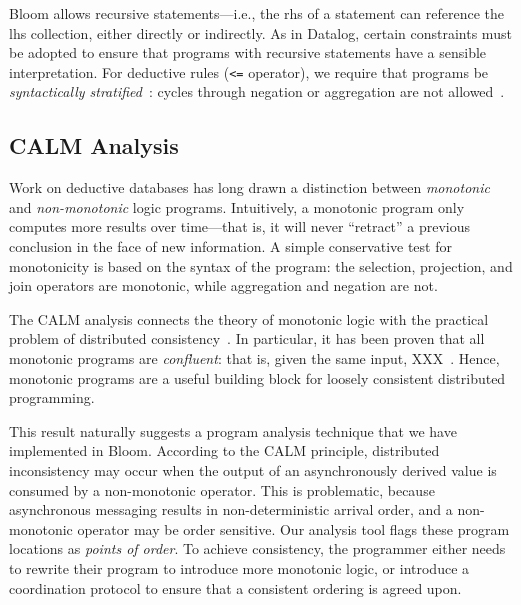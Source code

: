 Bloom allows recursive statements---i.e., the rhs of a statement can reference
the lhs collection, either directly or indirectly. As in Datalog, certain
constraints must be adopted to ensure that programs with recursive statements
have a sensible interpretation. For deductive rules (\verb+<=+ operator), we
require that programs be \emph{syntactically stratified}~\cite{Apt1988}: cycles
through negation or aggregation are not allowed~\cite{dedalus}.

\subsection{CALM Analysis}
\label{sec:bg-calm}

Work on deductive databases has long drawn a distinction between
\emph{monotonic} and \emph{non-monotonic} logic programs. Intuitively, a
monotonic program only computes more results over time---that is, it will never
``retract'' a previous conclusion in the face of new information. A simple
conservative test for monotonicity is based on the syntax of the program: the
selection, projection, and join operators are monotonic, while aggregation and
negation are not.

The CALM analysis connects the theory of monotonic logic with the practical
problem of distributed consistency~\cite{Alvaro2011}. In particular, it has been
proven that all monotonic programs are \emph{confluent}: that is, given the same
input, XXX~\cite{Ameloot2011}. Hence, monotonic programs are a useful building
block for loosely consistent distributed programming.

This result naturally suggests a program analysis technique that we have
implemented in Bloom. According to the CALM principle, distributed inconsistency
may occur when the output of an asynchronously derived value is consumed by a
non-monotonic operator. This is problematic, because asynchronous messaging
results in non-deterministic arrival order, and a non-monotonic operator may be
order sensitive. Our analysis tool flags these program locations as \emph{points
  of order}. To achieve consistency, the programmer either needs to rewrite
their program to introduce more monotonic logic, or introduce a coordination
protocol to ensure that a consistent ordering is agreed upon.

